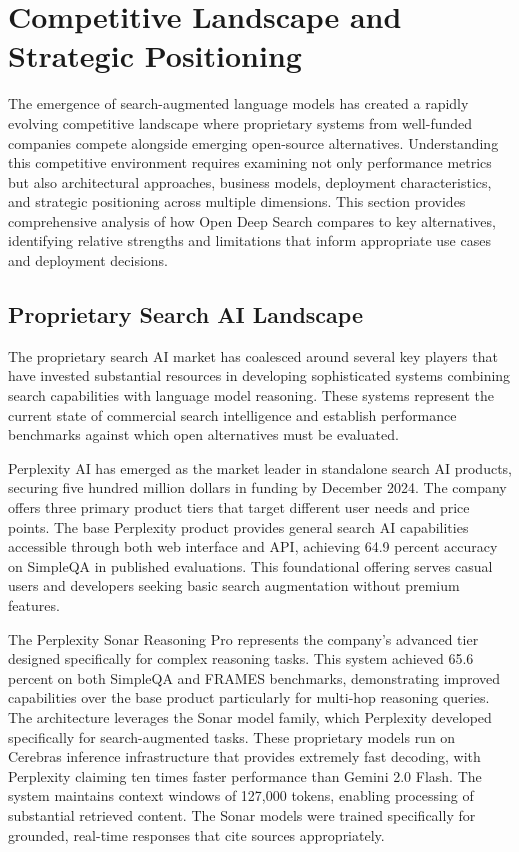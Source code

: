 \section{Competitive Landscape and Strategic Positioning}

The emergence of search-augmented language models has created a rapidly evolving competitive landscape where proprietary systems from well-funded companies compete alongside emerging open-source alternatives. Understanding this competitive environment requires examining not only performance metrics but also architectural approaches, business models, deployment characteristics, and strategic positioning across multiple dimensions. This section provides comprehensive analysis of how Open Deep Search compares to key alternatives, identifying relative strengths and limitations that inform appropriate use cases and deployment decisions.

\subsection{Proprietary Search AI Landscape}

The proprietary search AI market has coalesced around several key players that have invested substantial resources in developing sophisticated systems combining search capabilities with language model reasoning. These systems represent the current state of commercial search intelligence and establish performance benchmarks against which open alternatives must be evaluated.

Perplexity AI has emerged as the market leader in standalone search AI products, securing five hundred million dollars in funding by December 2024. The company offers three primary product tiers that target different user needs and price points. The base Perplexity product provides general search AI capabilities accessible through both web interface and API, achieving 64.9 percent accuracy on SimpleQA in published evaluations. This foundational offering serves casual users and developers seeking basic search augmentation without premium features.

The Perplexity Sonar Reasoning Pro represents the company's advanced tier designed specifically for complex reasoning tasks. This system achieved 65.6 percent on both SimpleQA and FRAMES benchmarks, demonstrating improved capabilities over the base product particularly for multi-hop reasoning queries. The architecture leverages the Sonar model family, which Perplexity developed specifically for search-augmented tasks. These proprietary models run on Cerebras inference infrastructure that provides extremely fast decoding, with Perplexity claiming ten times faster performance than Gemini 2.0 Flash. The system maintains context windows of 127,000 tokens, enabling processing of substantial retrieved content. The Sonar models were trained specifically for grounded, real-time responses that cite sources appropriately.

